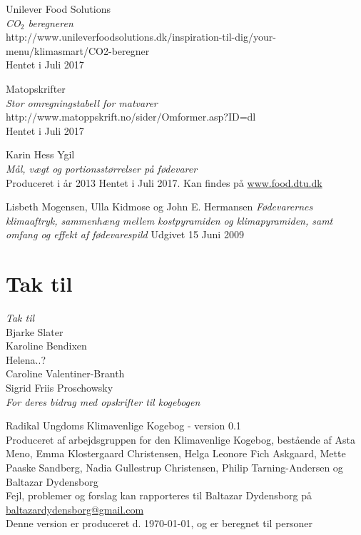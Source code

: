 \documentclass[11pt, a4paper]{article}
\newcommand{\coo}{CO$_2$ }
\begin{document}
\begin{thebibliography}{9}
	Unilever Food Solutions\\
	\textit{\coo beregneren}\\
	http://www.unileverfoodsolutions.dk/inspiration-til-dig/your-menu/klimasmart/CO2-beregner\\
	Hentet i Juli 2017
	
	Matopskrifter\\
	\textit{Stor omregningstabell for matvarer}\\
	http://www.matoppskrift.no/sider/Omformer.asp?ID=dl\\
	Hentet i Juli 2017
	
 Karin Hess Ygil\\
	\textit{Mål, vægt og portionsstørrelser på fødevarer}\\
	Produceret i år 2013
	Hentet i Juli 2017. Kan findes på \url{www.food.dtu.dk}
	
	Lisbeth Mogensen, Ulla Kidmose og John E. Hermansen
	\textit{Fødevarernes klimaaftryk,
		sammenhæng mellem kostpyramiden og klimapyramiden,
		samt omfang og effekt af fødevarespild}
	Udgivet 15 Juni 2009
	
\end{thebibliography}

\newpage

\section*{Tak til}
\textit{Tak til}\\

Bjarke Slater\\

Karoline Bendixen\\

Helena..?\\

Caroline Valentiner-Branth\\

Sigrid Friis Proschowsky\\

\textit{For deres bidrag med opskrifter til kogebogen}



	\newpage
	\centering Radikal Ungdoms Klimavenlige Kogebog - version 0.1\\
	Produceret af arbejdsgruppen for den Klimavenlige Kogebog, bestående af Asta Meno, Emma Klostergaard Christensen, Helga Leonore Fich Askgaard, Mette Paaske Sandberg, Nadia Gullestrup Christensen, Philip Tarning-Andersen og Baltazar Dydensborg\\
	Fejl, problemer og forslag kan rapporteres til Baltazar Dydensborg på \href{mailto:baltazardydensborg@gmail.com}{baltazardydensborg@gmail.com}\\
	Denne version er produceret d. \today, og er beregnet til \ruNumPersons{} personer
\end{document}
